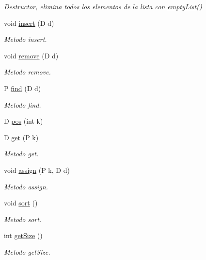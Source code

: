 \begin{DoxyCompactItemize}
\begin{DoxyCompactList}\small\item\em Destructor, elimina todos los elementos de la lista con \hyperlink{class_list_with_pointer_aec4f5374971962c79d397bbcd0080199}{empty\-List()} \end{DoxyCompactList}\item 
void \hyperlink{class_list_with_pointer_a676e57683ade8e179e8eff5885f7309a}{insert} (D d)
\begin{DoxyCompactList}\small\item\em Metodo insert. \end{DoxyCompactList}\item 
void \hyperlink{class_list_with_pointer_abcb151e95e9fffea7f9f7af593d8176f}{remove} (D d)
\begin{DoxyCompactList}\small\item\em Metodo remove. \end{DoxyCompactList}\item 
P \hyperlink{class_list_with_pointer_afeff8b963c197378553e2a3f73eaf66a}{find} (D d)
\begin{DoxyCompactList}\small\item\em Metodo find. \end{DoxyCompactList}\item 
D \hyperlink{class_list_with_pointer_adcabcbf64c681a7709c1d5ecde63e150}{pos} (int k)
\item 
D \hyperlink{class_list_with_pointer_a0ff36c852334da8bc167356e636c1846}{get} (P k)
\begin{DoxyCompactList}\small\item\em Metodo get. \end{DoxyCompactList}\item 
void \hyperlink{class_list_with_pointer_aeaa834b22c4d7276a77ff29df3da7a30}{assign} (P k, D d)
\begin{DoxyCompactList}\small\item\em Metodo assign. \end{DoxyCompactList}\item 
void \hyperlink{class_list_with_pointer_aa46631b2da29895d1f767626fb591bc8}{sort} ()
\begin{DoxyCompactList}\small\item\em Metodo sort. \end{DoxyCompactList}\item 
int \hyperlink{class_list_with_pointer_ac70c49b5703887fd867e90cdac3c706f}{get\-Size} ()
\begin{DoxyCompactList}\small\item\em Metodo get\-Size. \end{DoxyCompactList}\item 

\end{DoxyCompactItemize}
